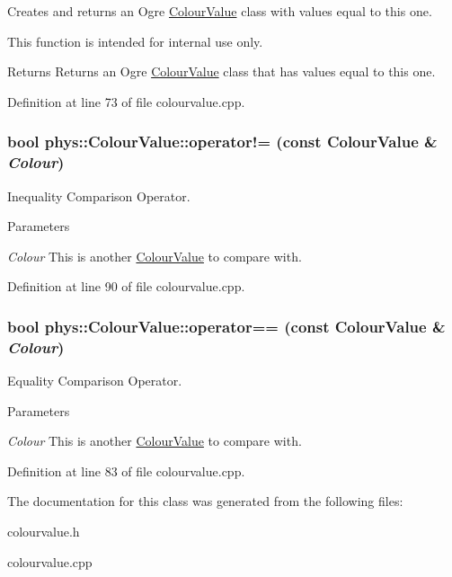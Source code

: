 Creates and returns an Ogre \hyperlink{classphys_1_1ColourValue}{ColourValue} class with values equal to this one. 

This function is intended for internal use only. \begin{DoxyReturn}{Returns}
Returns an Ogre \hyperlink{classphys_1_1ColourValue}{ColourValue} class that has values equal to this one. 
\end{DoxyReturn}


Definition at line 73 of file colourvalue.cpp.

\hypertarget{classphys_1_1ColourValue_a06b52ce51b723ea733f2b067b03530a5}{
\subsubsection[{operator!=}]{\setlength{\rightskip}{0pt plus 5cm}bool phys::ColourValue::operator!= (const {\bf ColourValue} \& {\em Colour})}}
\label{d3/db0/classphys_1_1ColourValue_a06b52ce51b723ea733f2b067b03530a5}


Inequality Comparison Operator. 


\begin{DoxyParams}{Parameters}
\item[{\em Colour}]This is another \hyperlink{classphys_1_1ColourValue}{ColourValue} to compare with. \end{DoxyParams}


Definition at line 90 of file colourvalue.cpp.

\hypertarget{classphys_1_1ColourValue_a4615835cadb51c814ef87377ac2fbc8c}{
\subsubsection[{operator==}]{\setlength{\rightskip}{0pt plus 5cm}bool phys::ColourValue::operator== (const {\bf ColourValue} \& {\em Colour})}}
\label{d3/db0/classphys_1_1ColourValue_a4615835cadb51c814ef87377ac2fbc8c}


Equality Comparison Operator. 


\begin{DoxyParams}{Parameters}
\item[{\em Colour}]This is another \hyperlink{classphys_1_1ColourValue}{ColourValue} to compare with. \end{DoxyParams}


Definition at line 83 of file colourvalue.cpp.



The documentation for this class was generated from the following files:\begin{DoxyCompactItemize}
\item 
colourvalue.h\item 
colourvalue.cpp\end{DoxyCompactItemize}
